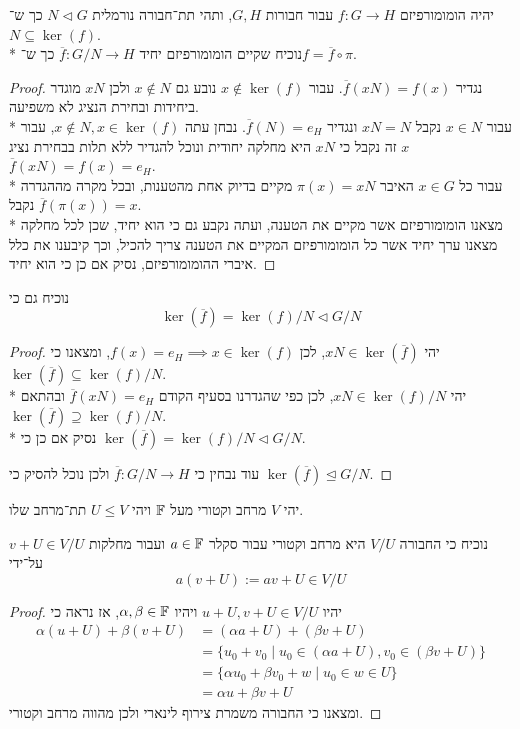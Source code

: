 \Question{}
\Subquestion{}
יהיה הומומורפיזם $f : G \to H$ עבור חבורות $G, H$, ותהי תת־חבורה נורמלית $N \triangleleft G$ כך ש־$N \subseteq \ker(f)$. \\*
נוכיח שקיים הומומורפיזם יחיד $\overline{f} : G/N \to H$ כך ש־$f = \overline{f} \circ \pi$.
\begin{proof}
	נגדיר $\overline{f}(xN) = f(x)$. עבור $x \notin \ker(f)$ נובע גם $x \notin N$ ולכן $xN$ מוגדר ביחידות ובחירת הנציג לא משפיעה. \\*
	עבור $x \in N$ נקבל $x N = N$ ונגדיר $\overline{f}(N) = e_H$.
	נבחן עתה $x \notin N, x \in \ker(f)$, עבור $x$ זה נקבל כי $xN$ היא מחלקה יחודית ונוכל להגדיר ללא תלות בבחירת נציג $\overline{f}(xN) = f(x) = e_H$. \\*
	עבור כל $x \in G$ האיבר $\pi(x) = x N$ מקיים בדיוק אחת מהטענות, ובכל מקרה מההגדרה נקבל $\overline{f}(\pi(x)) = x$. \\*
	מצאנו הומומורפיזם אשר מקיים את הטענה, ועתה נקבע גם כי הוא יחיד, שכן לכל מחלקה מצאנו ערך יחיד אשר כל הומומורפיזם המקיים את הטענה צריך להכיל, וכך קיבענו את כלל איברי ההומומורפיזם, נסיק אם כן כי הוא יחיד.
\end{proof}

\Subquestion{}
נוכיח גם כי
\[
	\ker(\overline{f}) = \ker(f)/N \triangleleft G/N
\]
\begin{proof}
	יהי $xN \in \ker(\overline{f})$, לכן $f(x) = e_H \implies x \in \ker(f)$, ומצאנו כי $\ker(\overline{f}) \subseteq \ker(f)/N$. \\*
	יהי $xN \in \ker(f)/N$, לכן כפי שהגדרנו בסעיף הקודם $\overline{f}(xN) = e_H$ ובהתאם $\ker(\overline{f}) \supseteq \ker(f)/N$. \\*
	נסיק אם כן כי $\ker(\overline{f}) = \ker(f)/N \triangleleft G/N$.

	עוד נבחין כי $\overline{f} : G/N \to H$ ולכן נוכל להסיק כי $\ker(\overline{f}) \trianglelefteq G/N$.
\end{proof}

\Question{}
יהי $V$ מרחב וקטורי מעל $\mathbb{F}$ ויהי $U \le V$ תת־מרחב שלו.

\Subquestion{}
נוכיח כי החבורה $V/U$ היא מרחב וקטורי עבור סקלר $a \in \mathbb{F}$ ועבור מחלקות $v + U \in V/U$ על־ידי
\[
	a(v + U) := av + U \in V/U
\]
\begin{proof}
	יהיו $u + U, v + U \in V/U$ ויהיו $\alpha, \beta \in \mathbb{F}$, אז נראה כי
	\begin{align*}
		\alpha(u + U) + \beta(v + U)
		& = (\alpha a + U) + (\beta v + U) \\
		& = \{ u_0 + v_0 \mid u_0 \in (\alpha a + U), v_0 \in (\beta v + U) \} \\
		& = \{ \alpha u_0 + \beta v_0 + w \mid u_0 \in w \in U \} \\
		& = \alpha u + \beta v + U
	\end{align*}
	ומצאנו כי החבורה משמרת צירוף לינארי ולכן מהווה מרחב וקטורי.
\end{proof}

